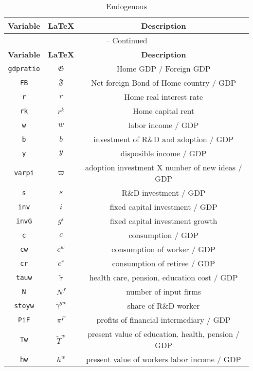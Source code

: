 \begin{center}
\begin{longtable}{ccc}
\caption{Endogenous}\\%
\hline%
\multicolumn{1}{c}{\textbf{Variable}} &
\multicolumn{1}{c}{\textbf{\LaTeX}} &
\multicolumn{1}{c}{\textbf{Description}}\\%
\hline\hline%
\endfirsthead
\multicolumn{3}{c}{{\tablename} \thetable{} -- Continued}\\%
\hline%
\multicolumn{1}{c}{\textbf{Variable}} &
\multicolumn{1}{c}{\textbf{\LaTeX}} &
\multicolumn{1}{c}{\textbf{Description}}\\%
\hline\hline%
\endhead
\texttt{gdpratio} & ${\mathfrak{G}}$ & Home GDP / Foreign GDP\\
\texttt{FB} & ${\mathfrak{F}}$ & Net foreign Bond of Home country / GDP\\
\texttt{r} & ${r}$ & Home real interest rate\\
\texttt{rk} & ${r^k}$ & Home capital rent\\
\texttt{w} & ${w}$ & labor income / GDP\\
\texttt{b} & ${b}$ & investment of R\&D and adoption / GDP\\
\texttt{y} & ${y}$ & disposible income / GDP\\
\texttt{varpi} & ${\varpi}$ & adoption investment X number of new ideas / GDP\\
\texttt{s} & ${s}$ & R\&D investment / GDP\\
\texttt{inv} & ${i}$ & fixed capital investment / GDP\\
\texttt{invG} & ${g^i}$ & fixed capital investment growth\\
\texttt{c} & ${c}$ & consumption / GDP\\
\texttt{cw} & ${c^w}$ & consumption of worker / GDP\\
\texttt{cr} & ${c^r}$ & consumption of retiree / GDP\\
\texttt{tauw} & $\tilde{\tau}$ & health care, pension, education cost / GDP\\
\texttt{N} & ${N^f}$ & number of input firms\\
\texttt{stoyw} & ${\gamma^{yw}}$ & share of R\&D worker\\
\texttt{PiF} & ${\pi^F}$ & profits of financial intermediary / GDP\\
\texttt{Tw} & ${\tilde{T}^w}$ & present value of education, health, pension / GDP\\
\texttt{hw} & ${h^w}$ & present value of workers labor income / GDP\\

\end{longtable}
\end{center}
